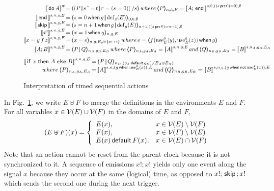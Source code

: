 \documentclass[copyright,creativecommons]{eptcs}
\newcommand{\V}{{\cal V}}
\newcommand{\vars}{\V}
\newcommand{\op}[1]{{\sf #1}}
\newcommand{\true}{1}
\newcommand{\false}{0}
\newcommand{\kw}[1]{{{\,\op{#1}\,}}}
\newcommand{\Sync}{\kw{\mbox{$\hat{~}$}=}}
\newcommand{\Default}{\kw{default}}
\newcommand{\When}{\kw{when}}
\newcommand{\Par}{{\,|\!\!|\,}}
\newcommand{\Def}{{\rm{def}}}
\newcommand{\Use}{{\rm{use}}}
\newcommand{\Sq}[1]{{[\![{#1}]\!]}}
\renewcommand{\:}{{:}}
\newcommand{\sq}[1]{\langle\!\!\langle{#1}\rangle\!\!\rangle}
\newcommand{\Do}{{\kw{do}}}
\newcommand{\Skip}{{\kw{skip}}}
\newcommand{\End}{{\kw{end}}}
\newcommand{\If}{{\kw{if}}}
\newcommand{\Then}{{\kw{then}}}
\newcommand{\Else}{{\kw{else}}}
\begin{document}
\begin{figure}[h!]
\hrulefill
\[
\begin{array}{@{}r@{\,}c@{\,}l@{}}
\Sq{\Do A}^{r\!t}&=&\sq{\left(P\Par s \Sync t\Par r=(s=0)\right)/s}\,
where\,\sq{P}_{n,h,F}=\Sq{A;\End}^{s,0,\left((s\,\op{pre}\,0)=0\right),\emptyset}\\[+\smallskipamount]
\Sq{\End}^{s,n,g,E}&=&\sq{s=0\When g\Par\Def_{g}(E)}_{0,\false,\emptyset}\\
\Sq{\Skip}^{s,n,g,E}&=&\sq{s=n+1\When g\Par\Def_{g}(E)}_{n+1,\left((s\,\op{pre}\,0)=n+1\right),\emptyset}\\
\Sq{x!}^{s,n,g,E}&=&\sq{x=\true\When g}_{n,g,E}\\
\Sq{x=y\,f\,z}^{s,n,g,E}&=&\sq{x=e}_{n,g,E_x\uplus\{x\mapsto e\}}\,
where\,e=\sq{f(\Use^g_E(y),\Use^g_E(z))\When g}\\[+\smallskipamount]
\Sq{A;B}^{s,n,g,E}&=&\sq{P\Par Q}_{n_B,g_B,E_B}\,
where\,\sq{P}_{n_A,g_A,E_A}=\Sq{A}^{s,n,g,E}\,
and\,\sq{Q}_{n_B,g_B,E_B}=\Sq{B}^{s,n_A,g_A,E_A}\\
\end{array}
\]
\[
\begin{array}{@{}r@{\,}c@{\,}l@{}}
\Sq{\If\,x\,\Then\,A\,\Else\,B}^{s,n,g,E}&=&\sq{P\Par Q}_{n_B,(g_A\Default g_B),(E_A\uplus E_B)}\\
where\,\sq{P}_{n_A,g_A,E_A}&=&\Sq{A}^{s,n,(g\,\op{when}\,\Use^g_E(x)),E}\,
and\,\sq{Q}_{n_B,g_B,E_B}=\Sq{B}^{s,n_A,(g\,\op{when}\,\op{not}\,\Use^g_E(x)),E}\\
\end{array}
\]
\hrulefill
\caption{Interpretation of timed sequential actions}\label{fig3}
\end{figure}

In Fig.~\ref{fig3}, we write $E\uplus F$ to merge the definitions in the environments $E$ and $F$. For all variables $x\in\vars(E)\cup\vars(F)$ in the domains of $E$ and $F$,
\[
(E\uplus F)(x)=\left\{\begin{array}{ll}
E(x),&x\in\vars(E)\setminus\vars(F)\\
F(x),&x\in\vars(F)\setminus\vars(E)\\
E(x)\Default F(x),&x\in\vars(E)\cap\vars(F)\\
\end{array}\right.
\]
Note that an action cannot be reset from the parent clock because it is not synchronized to it. A sequence of emissions $x!;x!$ yields only one event along the signal $x$ because they occur at the same (logical) time, as opposed to $x!;\Skip;x!$ which sends the second one during the next trigger.
\end{document}
